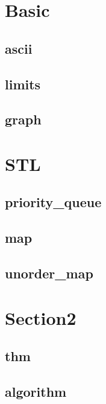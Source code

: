 \section{Basic}
    \subsection{ascii}
        
    \subsection{limits}
        
    \subsection{graph}
        

\section{STL}
    \subsection{priority\_queue}
        
    \subsection{map}
        
    \subsection{unorder\_map}
        

\section{Section2}
    \subsection{thm}
        
    \subsection{algorithm}
        